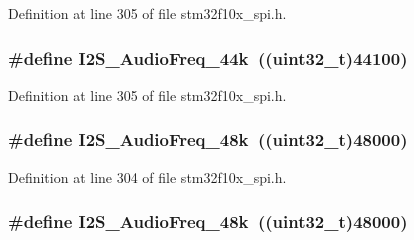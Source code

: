 Definition at line 305 of file stm32f10x\+\_\+spi.\+h.

\subsubsection[{\texorpdfstring{I2\+S\+\_\+\+Audio\+Freq\+\_\+44k}{I2S_AudioFreq_44k}}]{\setlength{\rightskip}{0pt plus 5cm}\#define I2\+S\+\_\+\+Audio\+Freq\+\_\+44k~(({\bf uint32\+\_\+t})44100)}\hypertarget{group___i2_s___audio___frequency_ga3514e4c292b92b8a7d8a6916f4e3690c}{}\label{group___i2_s___audio___frequency_ga3514e4c292b92b8a7d8a6916f4e3690c}


Definition at line 305 of file stm32f10x\+\_\+spi.\+h.

\subsubsection[{\texorpdfstring{I2\+S\+\_\+\+Audio\+Freq\+\_\+48k}{I2S_AudioFreq_48k}}]{\setlength{\rightskip}{0pt plus 5cm}\#define I2\+S\+\_\+\+Audio\+Freq\+\_\+48k~(({\bf uint32\+\_\+t})48000)}\hypertarget{group___i2_s___audio___frequency_gac5f3f0416f9dd03d680d0fcee93b50ab}{}\label{group___i2_s___audio___frequency_gac5f3f0416f9dd03d680d0fcee93b50ab}


Definition at line 304 of file stm32f10x\+\_\+spi.\+h.

\subsubsection[{\texorpdfstring{I2\+S\+\_\+\+Audio\+Freq\+\_\+48k}{I2S_AudioFreq_48k}}]{\setlength{\rightskip}{0pt plus 5cm}\#define I2\+S\+\_\+\+Audio\+Freq\+\_\+48k~(({\bf uint32\+\_\+t})48000)}\hypertarget{group___i2_s___audio___frequency_gac5f3f0416f9dd03d680d0fcee93b50ab}{}\label{group___i2_s___audio___frequency_gac5f3f0416f9dd03d680d0fcee93b50ab}


